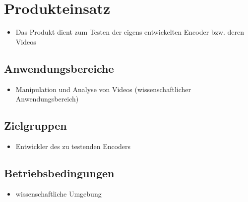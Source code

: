 \section{Produkteinsatz}

\begin{itemize}
	\item Das Produkt dient zum Testen der eigens entwickelten Encoder bzw. deren Videos
\end{itemize}

\subsection{Anwendungsbereiche}

\begin{itemize}
	\item Manipulation und Analyse von Videos (wissenschaftlicher Anwendungsbereich)
\end{itemize}

\subsection{Zielgruppen}

\begin{itemize}
	\item Entwickler des zu testenden Encoders
\end{itemize}

\subsection{Betriebsbedingungen}

\begin{itemize}
	\item wissenschaftliche Umgebung
\end{itemize}
